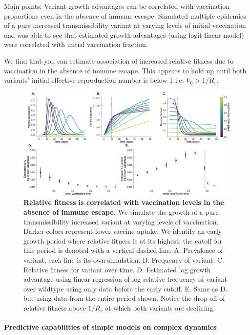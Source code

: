 \documentclass[12pt,oneside,letterpaper]{article}
\begin{document}
Main points:
Variant growth advantages can be correlated with vaccination proportions even in the absence of immune escape.
Simulated multiple epidemics of a pure increased transmissibility variant at varying levels of initial vaccination and was able to see that estimated growth advantages (using logit-linear model) were correlated with initial vaccination fraction.

We find that you can estimate association of increased relative fitness due to vaccination in the absence of immune escape.
This appears to hold up until both variants' initial effective reproduction number is below 1 i.e. $V_{0} > 1 / R_{v}$.

\begin{figure}[h]
    \centering
    \includegraphics[width=0.8\linewidth]{./figures/correlation_not_mechanism.png}
    \caption{\textbf{Relative fitness is correlated with vaccination levels in the absence of immune escape.} 
    We simulate the growth of a pure transmissibility increased variant at varying levels of vaccination.
    Darker colors represent lower vaccine uptake.
    We identify an early growth period where relative fitness is at its highest; the cutoff for this period is denoted with a vertical dashed line.
        A. Prevalence of variant, each line is its own simulation.
        B. Frequency of variant.
        C. Relative fitness for variant over time.
        D. Estimated log growth advantage using linear regression of log relative frequency of variant over wildtype using only data before the early cutoff.
        E. Same as D. but using data from the entire period shown. Notice the drop off of relative fitness above $1 / R_{v}$ at which both variants are declining.
    }
\label{fig:mechanism_identification}
\end{figure}


\paragraph{Predictive capabilities of simple models on complex dynamics}%
\end{document}
